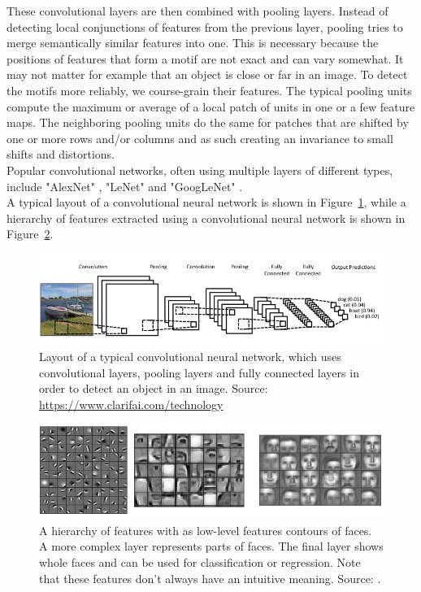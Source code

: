 These convolutional layers are then combined with pooling layers. Instead of detecting local conjunctions of features from the previous layer, pooling tries to merge semantically similar features into one. This is necessary because the positions of features that form a motif are not exact and can vary somewhat. It may not matter for example that an object is close or far in an image.
To detect the motifs more reliably, we course-grain their features. The typical pooling units compute the maximum or average of a local patch of units in one or a few feature maps. The neighboring pooling units do the same for patches that are shifted by one or more rows and/or columns and as such creating an invariance to small shifts and distortions.\\
Popular convolutional networks, often using multiple layers of different types, include "AlexNet" \parencite{conf/nips/KrizhevskySH12}, "LeNet" \parencite{lecun-gradientbased-learning-applied-1998} and "GoogLeNet" \parencite{DBLP:journals/corr/SzegedyLJSRAEVR14}.\\
A typical layout of a convolutional neural network is shown in Figure~\ref{fig:cnnlayout}, while a hierarchy of features extracted using a convolutional neural network is shown in Figure~\ref{fig:cnnfeatures}.\\
\begin{figure}[htb]
    \centering
    \includegraphics[width=\linewidth]{images/cnnlayout.png}
    \caption[Convolutional neural network layout]{Layout of a typical convolutional neural network, which uses convolutional layers, pooling layers and fully connected layers in order to detect an object in an image. Source: \url{https://www.clarifai.com/technology}}
    \label{fig:cnnlayout}
\end{figure}
\begin{figure}[htb]
    \centering
    \includegraphics[width=\linewidth]{images/cnnfeatures.png}
    \caption[Convolutional neural network features hierarchy]{A hierarchy of features with as low-level features contours of faces. A more complex layer represents parts of faces. The final layer shows whole faces and can be used for classification or regression. Note that these features don't always have an intuitive meaning. Source: \cite{conf/icml/LeeGRN09}.}
    \label{fig:cnnfeatures}
\end{figure}

